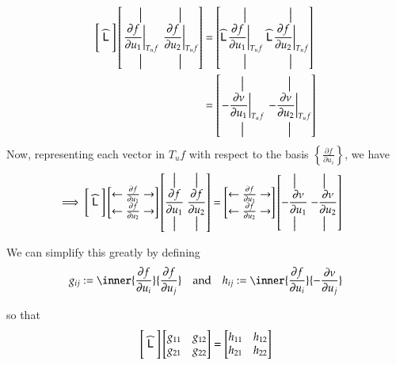 		\begin{align}
		\Bigg[ \;\widehat{\mathsf{L}}\; \Bigg]
		\left[ \overset{\big\vert}{\underset{\big\vert}{\left.\frac{\partial f}{\partial u_1}\right|_{T_u f}}} \;
				\overset{\big\vert}{\underset{\big\vert}{\left.\frac{\partial f}{\partial u_2}\right|_{T_u f}}} \right]
				&= \left[ \widehat{\mathsf{L}} \overset{\big\vert}{\underset{\big\vert}{\left.\frac{\partial f}{\partial u_1}\right|_{T_u f}}} \;
				\widehat{\mathsf{L}} \overset{\big\vert}{\underset{\big\vert}{\left.\frac{\partial f}{\partial u_2}\right|_{T_u f}}} \right] \\
				&= \left[ \overset{\big\vert}{\underset{\big\vert}{ \left.-\frac{\partial \nu}{\partial u_1}\right|_{T_u f}}} \;
				\overset{\big\vert}{\underset{\big\vert}{\left.-\frac{\partial \nu}{\partial u_2}\right|_{T_u f}}} \right]
				\end{align}
				Now, representing each vector in  $T_u f$ with respect to the basis $\left\{ \frac{\partial f}{\partial u_i}\right\}$, we have
				\begin{align}
				\implies
				\Bigg[ \;\widehat{\mathsf{L}}\; \Bigg]
				\begin{bmatrix} \leftarrow \frac{\partial f}{\partial u_1} \rightarrow \\
								\leftarrow \frac{\partial f}{\partial u_2} \rightarrow
								\end{bmatrix}
				\left[ \overset{\big\vert}{\underset{\big\vert}{\frac{\partial f}{\partial u_1}}} \;
					\overset{\big\vert}{\underset{\big\vert}{\frac{\partial f}{\partial u_2}}}\right]
					&= \begin{bmatrix} \leftarrow \frac{\partial f}{\partial u_1} \rightarrow \\
					\leftarrow \frac{\partial f}{\partial u_2} \rightarrow
					\end{bmatrix}
					\left[ \overset{\big\vert}{\underset{\big\vert}{-\frac{\partial \nu}{\partial u_1}}} \;
					\overset{\big\vert}{\underset{\big\vert}{-\frac{\partial \nu}{\partial u_2}}}\right]
		\end{align}
				 
		We can simplify this greatly by defining 
		\begin{equation}\label{fundamentalformcoefficients}
		g_{ij} := \inner{\frac{\partial f}{\partial u_i}}{\frac{\partial f}{\partial u_j}}
		\quad \textrm{and}\quad
		h_{ij} := \inner{\frac{\partial f}{\partial u_i}}{-\frac{\partial \nu}{\partial u_j}}
		\end{equation}
		
		so that
		\begin{equation}
		\Bigg[ \;\widehat{\mathsf{L}}\; \Bigg]
		\begin{bmatrix} g_{11} & g_{12} \\ g_{21} & g_{22} \end{bmatrix}
		= \begin{bmatrix} h_{11} & h_{12} \\ h_{21} & h_{22} \end{bmatrix}
		\end{equation}
		
